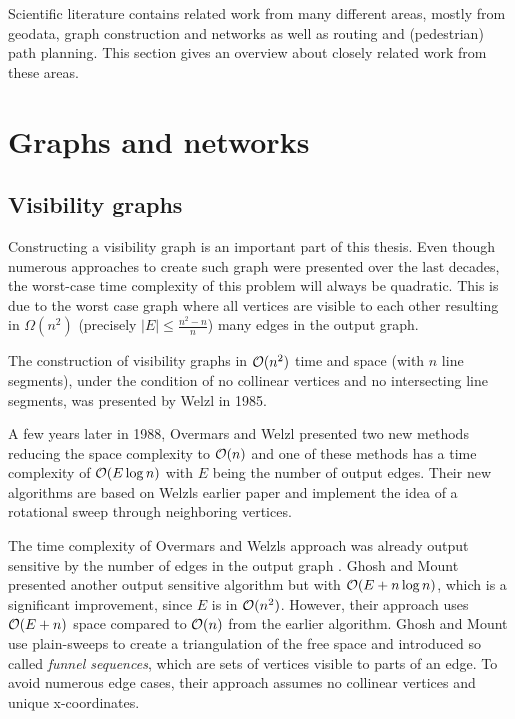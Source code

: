 
Scientific literature contains related work from many different areas, mostly from geodata, graph construction and networks as well as routing and (pedestrian) path planning.
This section gives an overview about closely related work from these areas.

\section{Graphs and networks}

	\subsection{Visibility graphs}
	\label{subsec:related-work:visibility-graph}

		Constructing a visibility graph is an important part of this thesis.
		Even though numerous approaches to create such graph were presented over the last decades, the worst-case time complexity of this problem will always be quadratic.
		This is due to the worst case graph where all vertices are visible to each other resulting in $\Omega(n^2)$ (precisely $|E| \leq \frac{n^2-n}{n}$) many edges in the output graph.
		
		The construction of visibility graphs in $\mathcal{O}(n^2)$ time and space (with $n$ line segments), under the condition of no collinear vertices and no intersecting line segments, was presented by Welzl in 1985\cite{welzl-visibility-graph}.
		
		A few years later in 1988, Overmars and Welzl presented two new methods reducing the space complexity to $\mathcal{O}(n)$ \cite{overmars-weizl-visibility-graph} and one of these methods has a time complexity of $\mathcal{O}(E \log n)$ with $E$ being the number of output edges.
		Their new algorithms are based on Welzls earlier paper and implement the idea of a rotational sweep through neighboring vertices.
		
		The time complexity of Overmars and Welzls approach was already output sensitive by the number of edges in the output graph \cite{ghosh-output-sensitive-vgraph}.
		Ghosh and Mount presented another output sensitive algorithm but with $\mathcal{O}(E + n \log n)$, which is a significant improvement, since $E$ is in $\mathcal{O}(n^2)$.
		However, their approach uses $\mathcal{O}(E + n)$ space compared to $\mathcal{O}(n)$ from the earlier algorithm.
		Ghosh and Mount use plain-sweeps to create a triangulation of the free space and introduced so called \emph{funnel sequences}, which are sets of vertices visible to parts of an edge.
		To avoid numerous edge cases, their approach assumes no collinear vertices and unique x-coordinates.
		
